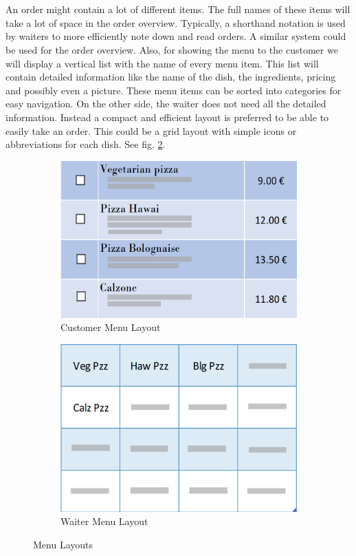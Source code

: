 \documentclass[12pt]{article}
\begin{document}
\\\\
An order might contain a lot of different items. The full names of these items will take a lot of space in the order overview. Typically, a shorthand notation is used by waiters to more efficiently note down and read orders. A similar system could be used for the order overview.
Also, for showing the menu to the customer we will display a vertical list with the name of every menu item. This list will contain detailed information like the name of the dish, the ingredients, pricing and possibly even a picture. These menu items can be sorted into categories for easy navigation. On the other side, the waiter does not need all the detailed information. Instead a compact and efficient layout is preferred to be able to easily take an order. This could be a grid layout with simple icons or abbreviations for each dish. See fig. \ref{fig:waitercustomer}.
\begin{figure}[h!]
	\begin{subfigure}{.5\textwidth}
		\includegraphics[width=0.9\linewidth]{customermenu.PNG}
		\caption{Customer Menu Layout}
		\label{fig:menucustomer}
	\end{subfigure}
	\begin{subfigure}{.5\textwidth}
		\includegraphics[width=0.9\linewidth]{waitermenu.PNG}
		\caption{Waiter Menu Layout}
		\label{fig:waitercustomer}
	\end{subfigure}
	\caption{Menu Layouts}
	\label{fig:menus}
\end{figure}
\end{document}
